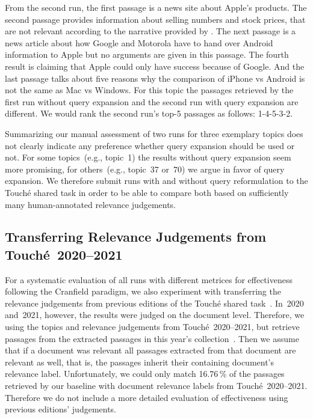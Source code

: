 From the second run, the first passage is a news site about Apple's products.
The second passage provides information about selling numbers and stock prices, that are not relevant according to the narrative provided by \citet{BondarenkoFKSGBPBSWPH2022}.
The next passage is a news article about how Google and Motorola have to hand over Android information to Apple but no arguments are given in this passage.
The fourth result is claiming that Apple could only have success because of Google.
And the last passage talks about five reasons why the comparison of iPhone vs Android is not the same as Mac vs Windows.
For this topic the passages retrieved by the first run without query expansion and the second run with query expansion are different.
We would rank the second run's top-5 passages as follows: 1-4-5-3-2.

Summarizing our manual assessment of two runs for three exemplary topics does not clearly indicate any preference whether query expansion should be used or not.
For some topics~(e.g., topic~1) the results without query expansion seem more promising, for others~(e.g., topic~37 or~70) we argue in favor of query expansion.
We therefore submit runs with and without query reformulation to the Touché shared task in order to be able to compare both based on sufficiently many human-annotated relevance judgements.

\subsection{Transferring Relevance Judgements from Touché~2020--2021}
\label{transfer-relevance-judgements}

For a systematic evaluation of all runs with different metrices for effectiveness following the Cranfield paradigm, we also experiment with transferring the relevance judgements from previous editions of the Touché shared task~\cite{BondarenkoFBGAPBSWPH2020,BondarenkoGFBAPBSWPH2021}.
In~2020 and~2021, however, the results were judged on the document level.
Therefore, we using the topics and relevance judgements from Touché~2020--2021, but retrieve passages from the extracted passages in this year's collection~\cite{BondarenkoFKSGBPBSWPH2022}.
Then we assume that if a document was relevant all passages extracted from that document are relevant as well, that is, the passages inherit their containing document's relevance label.
Unfortunately, we could only match 16.76\,\% of the passages retrieved by our baseline with document relevance labels from Touché~2020--2021.
Therefore we do not include a more detailed evaluation of effectiveness using previous editions' judgements.
